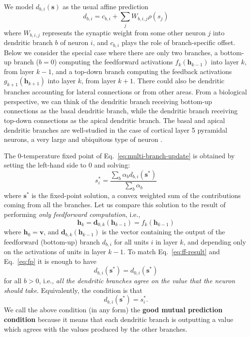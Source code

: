 \documentclass{article}
\newcommand   \vv{{\bm v}}
\newcommand   \vh{{\bm h}}
\newcommand   \vs{{\bm s}}
\newcommand   \vd{{\bm d}}
\begin{document}
We model $d_{b,i}(\vs)$ as the usual affine prediction
\begin{equation}
  \label{eq:affine-branch}
   d_{b,i} = c_{b,i} + \sum_j W_{b,i,j} \rho(s_j)
\end{equation}
where $W_{b,i,j}$ represents the synaptic weight from some other neuron $j$ into dendritic
branch $b$ of neuron $i$, and $c_{b,i}$ plays the role of branch-specific offset.
Below we consider the special case where there
are only two branches, a bottom-up branch ($b=0$) computing the feedforward activations
$f_k(\vh_{k-1})$ into layer $k$, from layer $k-1$, and a top-down branch computing the
feedback activations $g_{k+1}(\vh_{k+1})$ into layer $k$, from layer $k+1$. There
could also be dendritic branches accounting for lateral connections or from other areas. 
From a biological perspective, we can think of the dendritic branch receiving bottom-up connections
as the basal dendritic branch, while the dendritic branch receiving top-down connections
as the apical dendritic branch.
The basal and apical dendritic branches are well-studied in the case of cortical layer 5
pyramidal neurons, a very large and ubiquitous type of neuron \cite{Larkum2013}.

The 0-temperature fixed point of Eq.~\ref{eq:multi-branch-update} is obtained
by setting the left-hand side to 0 and solving:
\begin{equation}
  \label{eq:fp}
  s^*_i = \frac{\sum_b \alpha_b d_{b,i}(\vs^*)}{\sum_b \alpha_b}
\end{equation}
where $\vs^*$ is the fixed-point solution, a convex weighted sum of the contributions
coming from all the branches.
Let us compare this solution to the result of performing {\em only feedforward
  computation}, i.e.,
\begin{equation}
  \label{eq:ff-result}
  \vh_k = \vd_{0,k}(\vh_{k-1}) = f_k(\vh_{k-1})
\end{equation}
where $\vh_0=\vv$, and $\vd_{b,k}(\vh_{k-1})$ is the vector
containing the output of the feedforward (bottom-up) branch $d_{b,i}$ for all units $i$ in layer $k$,
and depending only on the activations of units in layer $k-1$.
To match Eq.~\ref{eq:ff-result} and Eq.~\ref{eq:fp} it is enough
to have
\begin{equation}
  \label{eq:ff-layerwise}
   d_{b,i}(\vs^*) = d_{0,i}(\vs^*)
\end{equation}
for all $b>0$, i.e., {\em all the dendritic branches agree on the
  value that the neuron should take}. Equivalently, the condition is that
\begin{equation}
  \label{eq:condition}
     d_{b,i}(\vs^*) = s^*_i.
\end{equation}
We call the above condition (in any form) the {\bf good mutual prediction condition}
because it means that each dendritic branch is outputting a value which agrees with
the values produced by the other branches.
\end{document}
